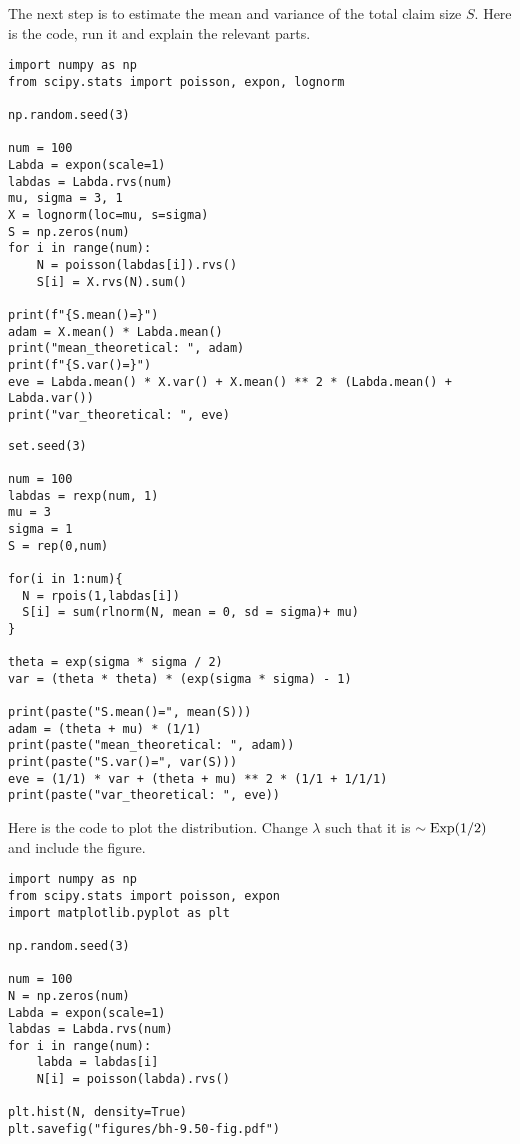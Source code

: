 \begin{exercise}
The next step is to estimate the mean and variance of the total claim size $S$.
Here is the code, run it and explain the relevant parts.
\begin{verbatim}
import numpy as np
from scipy.stats import poisson, expon, lognorm

np.random.seed(3)

num = 100
Labda = expon(scale=1)
labdas = Labda.rvs(num)
mu, sigma = 3, 1
X = lognorm(loc=mu, s=sigma)
S = np.zeros(num)
for i in range(num):
    N = poisson(labdas[i]).rvs()
    S[i] = X.rvs(N).sum()

print(f"{S.mean()=}")
adam = X.mean() * Labda.mean()
print("mean_theoretical: ", adam)
print(f"{S.var()=}")
eve = Labda.mean() * X.var() + X.mean() ** 2 * (Labda.mean() + Labda.var())
print("var_theoretical: ", eve)
\end{verbatim}
\end{exercise}

\begin{verbatim}
set.seed(3)

num = 100
labdas = rexp(num, 1)
mu = 3
sigma = 1
S = rep(0,num)

for(i in 1:num){
  N = rpois(1,labdas[i])
  S[i] = sum(rlnorm(N, mean = 0, sd = sigma)+ mu)
}

theta = exp(sigma * sigma / 2)
var = (theta * theta) * (exp(sigma * sigma) - 1)

print(paste("S.mean()=", mean(S)))
adam = (theta + mu) * (1/1)
print(paste("mean_theoretical: ", adam))
print(paste("S.var()=", var(S)))
eve = (1/1) * var + (theta + mu) ** 2 * (1/1 + 1/1/1)
print(paste("var_theoretical: ", eve))
\end{verbatim}

\begin{exercise}
Here is the code to plot the distribution. Change $\lambda$ such that it is $\sim\mathrm{Exp}(1/2)$ and include the figure.
\begin{verbatim}
import numpy as np
from scipy.stats import poisson, expon
import matplotlib.pyplot as plt

np.random.seed(3)

num = 100
N = np.zeros(num)
Labda = expon(scale=1)
labdas = Labda.rvs(num)
for i in range(num):
    labda = labdas[i]
    N[i] = poisson(labda).rvs()

plt.hist(N, density=True)
plt.savefig("figures/bh-9.50-fig.pdf")
\end{verbatim}
\end{exercise}

